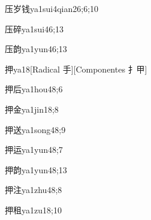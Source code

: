 
\begin{verbete}{压岁钱}{ya1sui4qian2}{6;6;10}
\end{verbete}

\begin{verbete}{压碎}{ya1sui4}{6;13}
\end{verbete}

\begin{verbete}{压韵}{ya1yun4}{6;13}
\end{verbete}

\begin{verbete}{押}{ya1}{8}[Radical 手][Componentes 扌甲]
\end{verbete}

\begin{verbete}{押后}{ya1hou4}{8;6}
\end{verbete}

\begin{verbete}{押金}{ya1jin1}{8;8}
\end{verbete}

\begin{verbete}{押送}{ya1song4}{8;9}
\end{verbete}

\begin{verbete}{押运}{ya1yun4}{8;7}
\end{verbete}

\begin{verbete}{押韵}{ya1yun4}{8;13}
\end{verbete}

\begin{verbete}{押注}{ya1zhu4}{8;8}
\end{verbete}

\begin{verbete}{押租}{ya1zu1}{8;10}
\end{verbete}


